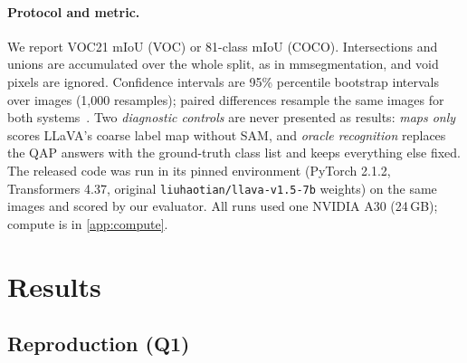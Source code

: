 \documentclass{article}
\newcommand{\miou}{mIoU}
\begin{document}
\paragraph{Protocol and metric.} We report VOC21 \miou{} (VOC) or 81-class \miou{} (COCO).
Intersections and unions are accumulated over the whole split, as in mmsegmentation, and void pixels
are ignored. Confidence intervals are 95\% percentile bootstrap intervals over images (1,000
resamples); paired differences resample the same images for both systems~\citep{efron1994bootstrap}.
Two \emph{diagnostic controls} are never presented as results: \emph{maps only} scores LLaVA's coarse
label map without SAM, and \emph{oracle recognition} replaces the QAP answers with the ground-truth
class list and keeps everything else fixed. The released code was run in its pinned environment
(PyTorch 2.1.2, Transformers 4.37, original \texttt{liuhaotian/llava-v1.5-7b} weights) on the same
images and scored by our evaluator. All runs used one NVIDIA A30 (24\,GB); compute is in
\cref{app:compute}.

\section{Results}
\label{sec:results}

\subsection{Reproduction (Q1)}
\label{sec:repro}
\end{document}
